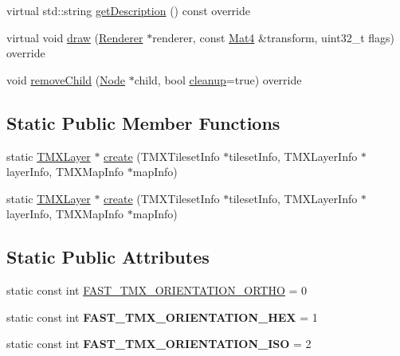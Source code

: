 \begin{DoxyCompactItemize}
\item 
virtual std\+::string \hyperlink{classexperimental_1_1TMXLayer_a5d2c509af2c8beec8b9e52ca6fad0b91}{get\+Description} () const override
\item 
virtual void \hyperlink{classexperimental_1_1TMXLayer_a3cf6988a4f6c23c695b0c3b9bd1c2d5d}{draw} (\hyperlink{classRenderer}{Renderer} $\ast$renderer, const \hyperlink{classMat4}{Mat4} \&transform, uint32\+\_\+t flags) override
\item 
void \hyperlink{classexperimental_1_1TMXLayer_a13544208580495a457a7ec1f2da9a4d1}{remove\+Child} (\hyperlink{classNode}{Node} $\ast$child, bool \hyperlink{classNode_aa2de84c6cdeec9cd647d236c30ee0567}{cleanup}=true) override
\end{DoxyCompactItemize}
\subsection*{Static Public Member Functions}
\begin{DoxyCompactItemize}
\item 
static \hyperlink{classexperimental_1_1TMXLayer}{T\+M\+X\+Layer} $\ast$ \hyperlink{classexperimental_1_1TMXLayer_a22e3cc3083001b861cb059f8b9cf634e}{create} (T\+M\+X\+Tileset\+Info $\ast$tileset\+Info, T\+M\+X\+Layer\+Info $\ast$layer\+Info, T\+M\+X\+Map\+Info $\ast$map\+Info)
\item 
static \hyperlink{classexperimental_1_1TMXLayer}{T\+M\+X\+Layer} $\ast$ \hyperlink{classexperimental_1_1TMXLayer_a2ce0c668bf8c747b7fa86cb061537e36}{create} (T\+M\+X\+Tileset\+Info $\ast$tileset\+Info, T\+M\+X\+Layer\+Info $\ast$layer\+Info, T\+M\+X\+Map\+Info $\ast$map\+Info)
\end{DoxyCompactItemize}
\subsection*{Static Public Attributes}
\begin{DoxyCompactItemize}
\item 
static const int \hyperlink{classexperimental_1_1TMXLayer_a0fa70f0200fdb90f7a826ee0ce900015}{F\+A\+S\+T\+\_\+\+T\+M\+X\+\_\+\+O\+R\+I\+E\+N\+T\+A\+T\+I\+O\+N\+\_\+\+O\+R\+T\+HO} = 0
\item 
\mbox{\label{classexperimental_1_1TMXLayer_ac4d90ac7af3a2a24fcf4075d862c551f}} 
static const int {\bfseries F\+A\+S\+T\+\_\+\+T\+M\+X\+\_\+\+O\+R\+I\+E\+N\+T\+A\+T\+I\+O\+N\+\_\+\+H\+EX} = 1
\item 
\mbox{\label{classexperimental_1_1TMXLayer_ab2e56e9abe2c88ef8a09415be55979f7}} 
static const int {\bfseries F\+A\+S\+T\+\_\+\+T\+M\+X\+\_\+\+O\+R\+I\+E\+N\+T\+A\+T\+I\+O\+N\+\_\+\+I\+SO} = 2
\end{DoxyCompactItemize}
